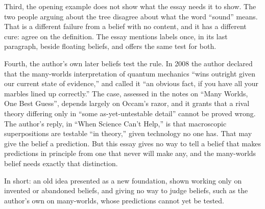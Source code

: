 \begin{afterword}
Third, the opening example does not show what the essay needs it to show. The two people arguing about the tree disagree about what the word ``sound'' means. That is a different failure from a belief with no content, and it has a different cure: agree on the definition. The essay mentions labels once, in its last paragraph, beside floating beliefs, and offers the same test for both.

Fourth, the author's own later beliefs test the rule. In 2008 the author declared that the many-worlds interpretation of quantum mechanics ``wins outright given our current state of evidence,'' and called it ``an obvious fact, if you have all your marbles lined up correctly.'' The case, assessed in the notes on ``Many Worlds, One Best Guess'', depends largely on Occam's razor, and it grants that a rival theory differing only in ``some as-yet-untestable detail'' cannot be proved wrong. The author's reply, in ``When Science Can't Help,'' is that macroscopic superpositions are testable ``in theory,'' given technology no one has. That may give the belief a prediction. But this essay gives no way to tell a belief that makes predictions in principle from one that never will make any, and the many-worlds belief needs exactly that distinction.

In short: an old idea presented as a new foundation, shown working only on invented or abandoned beliefs, and giving no way to judge beliefs, such as the author's own on many-worlds, whose predictions cannot yet be tested.
\end{afterword}
